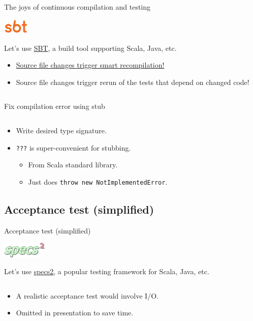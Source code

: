 \begin{frame}[fragile]{The joys of continuous compilation and testing}
  \begin{center}
    \includegraphics[height=0.75cm]{sbt-logo-orange-600x360.png}
  \end{center}

  Let's use \href{http://www.scala-sbt.org/}{SBT}, a build tool supporting Scala, Java, etc.

  \begin{itemize}
  \item \href{http://www.scala-sbt.org/release/docs/Detailed-Topics/Triggered-Execution.html}{Source file changes trigger smart recompilation!}
  \item Source file changes trigger rerun of the tests that depend on changed code!
  \end{itemize}

  \inputminted{console}{testQuick.console}
\end{frame}

\begin{frame}[fragile]{Fix compilation error using stub}
  \inputminted{scala}{Main2.scala}

  \begin{itemize}
  \item Write desired type signature.
  \item \texttt{???} is super-convenient for stubbing.
    \begin{itemize}
    \item From Scala standard library.
    \item Just does \texttt{throw new NotImplementedError}.
    \end{itemize}
  \end{itemize}
\end{frame}

\subsection{Acceptance test (simplified)}

\begin{frame}[fragile]{Acceptance test (simplified)}
  \begin{center}
    \includegraphics[height=0.75cm]{specs2.png}
  \end{center}

  Let's use \href{http://specs2.org/}{specs2}, a popular testing framework for Scala, Java, etc.

  \inputminted{scala}{MainSpec1.scala}

  \begin{itemize}
  \item A realistic acceptance test would involve I/O.
  \item Omitted in presentation to save time.
  \end{itemize}
\end{frame}

